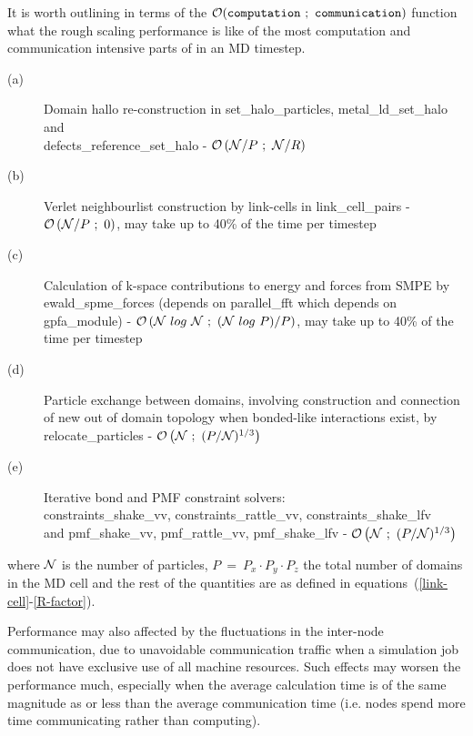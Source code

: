 It is worth outlining in terms of the
${\cal O}({\tt computation~;~communication})$ function what the
rough scaling performance is like of the most computation and
communication intensive parts of \D in an MD timestep.
\begin{description}
\item[(a)] Domain hallo re-construction in {\sc set\_halo\_particles},
{\sc metal\_ld\_set\_halo} and \\ {\sc defects\_reference\_set\_halo} -
${\cal O}\left({\cal N}/P~;~{\cal N}/R\right)$
\item[(b)] Verlet neighbourlist construction by link-cells in
{\sc link\_cell\_pairs} - ${\cal O}\left({\cal N}/P~;~0\right)$,
may take up to 40\% of the time per timestep
\item[(c)] Calculation of k-space contributions to energy and forces
from SMPE by {\sc ewald\_spme\_forces} (depends on {\sc parallel\_fft}
which depends on {\sc gpfa\_module}) -
${\cal O}\left({\cal N}~{\normalfont log}~{\cal N}~;~({\cal N}~{\normalfont log}~P)/P\right)$,
may take up to 40\% of the time per timestep
\item[(d)] Particle exchange between domains, involving construction
and connection of new out of domain topology when bonded-like
interactions exist, by {\sc relocate\_particles} -
${\cal O}\left({\cal N}~;~(P/{\cal N})^{1/3}\right)$
\item[(e)] Iterative bond and PMF constraint solvers: \\
{\sc constraints\_shake\_vv}, {\sc constraints\_rattle\_vv}, {\sc constraints\_shake\_lfv} \\
and {\sc pmf\_shake\_vv}, {\sc pmf\_rattle\_vv}, {\sc pmf\_shake\_lfv} -
${\cal O}\left({\cal N}~;~(P/{\cal N})^{1/3}\right)$
\end{description}
where ${\cal N}$ is the number of particles, $P~=~P_{x} \cdot P_{y} \cdot P_{z}$
the total number of domains in the MD cell and the rest of the quantities
are as defined in equations~(\ref{link-cell}-\ref{R-factor}).

Performance may also affected by the fluctuations in the inter-node
communication, due to unavoidable communication traffic when a
simulation job does not have exclusive use of all machine resources.
Such effects may worsen the performance much, especially when the
average calculation time is of the same magnitude as or less than
the average communication time (i.e. nodes spend more time
communicating rather than computing).
